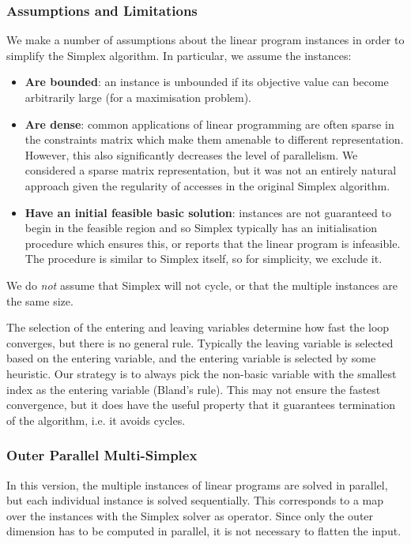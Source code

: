 \subsubsection{Assumptions and Limitations}
We make a number of assumptions about the linear program instances in order to simplify the Simplex algorithm. In particular, we assume the instances:
\begin{itemize}
\item \textbf{Are bounded}: an instance is unbounded if its objective value can become arbitrarily large (for a maximisation problem).
\item \textbf{Are dense}: common applications of linear programming are often sparse in the constraints matrix which make them amenable to different representation. However, this also significantly decreases the level of parallelism. We considered a sparse matrix representation, but it was not an entirely natural approach given the regularity of accesses in the original Simplex algorithm.
\item \textbf{Have an initial feasible basic solution}: instances are not guaranteed to begin in the feasible region and so Simplex typically has an initialisation procedure which ensures this, or reports that the linear program is infeasible. The procedure is similar to Simplex itself, so for simplicity, we exclude it.
\end{itemize}
We do \textit{not} assume that Simplex will not cycle, or that the multiple instances are the same size.

The selection of the entering and leaving variables determine how fast the loop converges, but there is no general rule. Typically the leaving variable is selected based on the entering variable, and the entering variable is selected by some heuristic. Our strategy is to always pick the non-basic variable with the smallest index as the entering variable (Bland's rule). This may not ensure the fastest convergence, but it does have the useful property that it guarantees termination of the algorithm, i.e. it avoids cycles.

\subsubsection{Outer Parallel Multi-Simplex}
In this version, the multiple instances of linear programs are solved in parallel, but each individual instance is solved sequentially. This corresponds to a map over the instances with the Simplex solver as operator. Since only the outer dimension has to be computed in parallel, it is not necessary to flatten the input.

